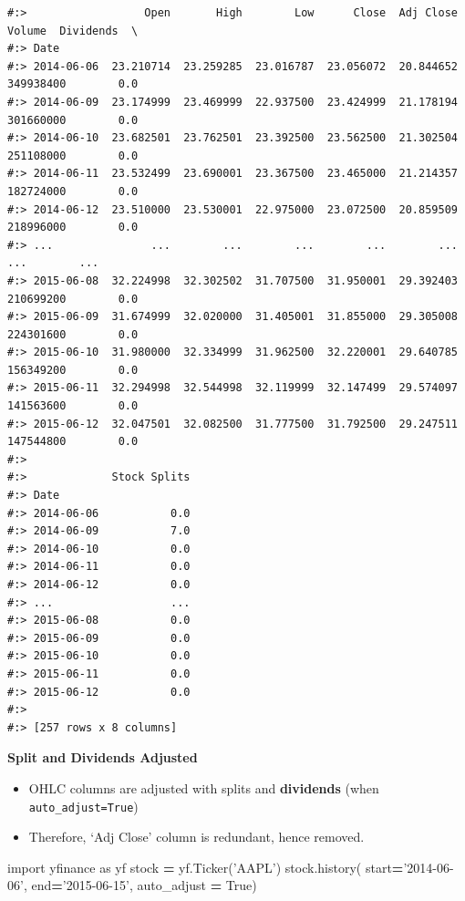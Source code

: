 \documentclass[
]{book}
\newenvironment{Shaded}{\begin{snugshade}}{\end{snugshade}}
\newcommand{\ImportTok}[1]{#1}
\newcommand{\NormalTok}[1]{#1}
\newcommand{\OperatorTok}[1]{\textcolor[rgb]{0.43,0.43,0.43}{\textbf{#1}}}
\newcommand{\StringTok}[1]{\textcolor[rgb]{0.5,0.5,0.5}{#1}}
\newcommand{\VariableTok}[1]{\textcolor[rgb]{0,0,0}{#1}}
\providecommand{\tightlist}{%
  \setlength{\itemsep}{0pt}\setlength{\parskip}{0pt}}
\begin{document}
\begin{verbatim}
#:>                  Open       High        Low      Close  Adj Close     Volume  Dividends  \
#:> Date                                                                                      
#:> 2014-06-06  23.210714  23.259285  23.016787  23.056072  20.844652  349938400        0.0   
#:> 2014-06-09  23.174999  23.469999  22.937500  23.424999  21.178194  301660000        0.0   
#:> 2014-06-10  23.682501  23.762501  23.392500  23.562500  21.302504  251108000        0.0   
#:> 2014-06-11  23.532499  23.690001  23.367500  23.465000  21.214357  182724000        0.0   
#:> 2014-06-12  23.510000  23.530001  22.975000  23.072500  20.859509  218996000        0.0   
#:> ...               ...        ...        ...        ...        ...        ...        ...   
#:> 2015-06-08  32.224998  32.302502  31.707500  31.950001  29.392403  210699200        0.0   
#:> 2015-06-09  31.674999  32.020000  31.405001  31.855000  29.305008  224301600        0.0   
#:> 2015-06-10  31.980000  32.334999  31.962500  32.220001  29.640785  156349200        0.0   
#:> 2015-06-11  32.294998  32.544998  32.119999  32.147499  29.574097  141563600        0.0   
#:> 2015-06-12  32.047501  32.082500  31.777500  31.792500  29.247511  147544800        0.0   
#:> 
#:>             Stock Splits  
#:> Date                      
#:> 2014-06-06           0.0  
#:> 2014-06-09           7.0  
#:> 2014-06-10           0.0  
#:> 2014-06-11           0.0  
#:> 2014-06-12           0.0  
#:> ...                  ...  
#:> 2015-06-08           0.0  
#:> 2015-06-09           0.0  
#:> 2015-06-10           0.0  
#:> 2015-06-11           0.0  
#:> 2015-06-12           0.0  
#:> 
#:> [257 rows x 8 columns]
\end{verbatim}

\textbf{Split and Dividends Adjusted}

\begin{itemize}
\tightlist
\item
  OHLC columns are adjusted with splits and \textbf{dividends} (when \texttt{auto\_adjust=True})\\
\item
  Therefore, `Adj Close' column is redundant, hence removed.
\end{itemize}

\begin{Shaded}
\begin{Highlighting}[]
\ImportTok{import}\NormalTok{ yfinance }\ImportTok{as}\NormalTok{ yf}
\NormalTok{stock }\OperatorTok{=}\NormalTok{ yf.Ticker(}\StringTok{'AAPL'}\NormalTok{)}
\NormalTok{stock.history(  start}\OperatorTok{=}\StringTok{'2014-06-06'}\NormalTok{, end}\OperatorTok{=}\StringTok{'2015-06-15'}\NormalTok{, auto_adjust }\OperatorTok{=} \VariableTok{True}\NormalTok{)}
\end{Highlighting}
\end{Shaded}
\end{document}

